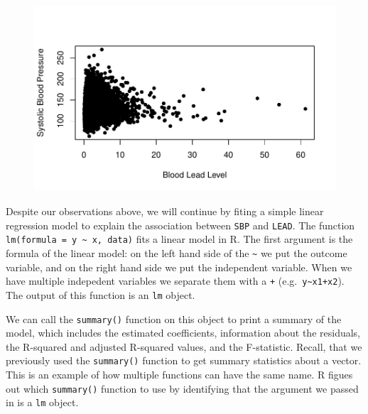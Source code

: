 \documentclass[
  letterpaper,
]{krantz}
\begin{document}
\begin{figure}[H]

{\centering \includegraphics[width=1\textwidth,height=\textheight]{book/10_linear_regression_files/figure-pdf/unnamed-chunk-4-1.pdf}

}

\end{figure}

Despite our observations above, we will continue by fiting a simple
linear regression model to explain the association between \texttt{SBP}
and \texttt{LEAD}. The function
\texttt{lm(formula\ =\ y\ \textasciitilde{}\ x,\ data)} fits a linear
model in R. The first argument is the formula of the linear model: on
the left hand side of the \texttt{\textasciitilde{}} we put the outcome
variable, and on the right hand side we put the independent variable.
When we have multiple indepedent variables we separate them with a
\texttt{+} (e.g.~\texttt{y\textasciitilde{}x1+x2}). The output of this
function is an \texttt{lm} object.

We can call the \texttt{summary()} function on this object to print a
summary of the model, which includes the estimated coefficients,
information about the residuals, the R-squared and adjusted R-squared
values, and the F-statistic. Recall, that we previously used the
\texttt{summary()} function to get summary statistics about a vector.
This is an example of how multiple functions can have the same name. R
figues out which \texttt{summary()} function to use by identifying that
the argument we passed in is a \texttt{lm} object.
\end{document}
